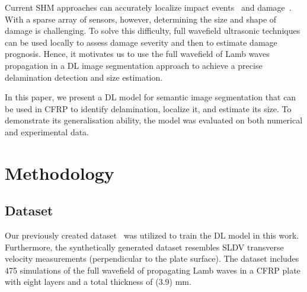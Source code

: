 \documentclass[runningheads]{llncs}
\begin{document}
Current SHM approaches can accurately localize impact events~\cite{Ciampa2012} and damage~\cite{Nokhbatolfoghahai2020}.
With a sparse array of sensors, however, determining the size and shape of damage is challenging.
To solve this difficulty, full wavefield ultrasonic techniques can be used locally to assess damage severity and then to estimate damage prognosis.
Hence, it motivates us to use the full wavefield of Lamb waves propagation in a DL image segmentation approach to achieve a precise delamination detection and size estimation.

In this paper, we present a DL model for semantic image segmentation that can be used in CFRP to identify delamination, localize it, and estimate its size.
To demonstrate its generalisation ability, the model was evaluated on both numerical and experimental data.
\section{Methodology}
\label{methodology}
\subsection{Dataset}
Our previously created dataset~\cite{Ijjeh2021} was utilized to train the DL model in this work.
Furthermore, the synthetically generated dataset resembles SLDV transverse velocity measurements (perpendicular to the plate surface).
The dataset includes 475 simulations of the full wavefield of propagating Lamb waves in a CFRP plate with eight layers and a total thickness of (3.9) mm.
\end{document}
